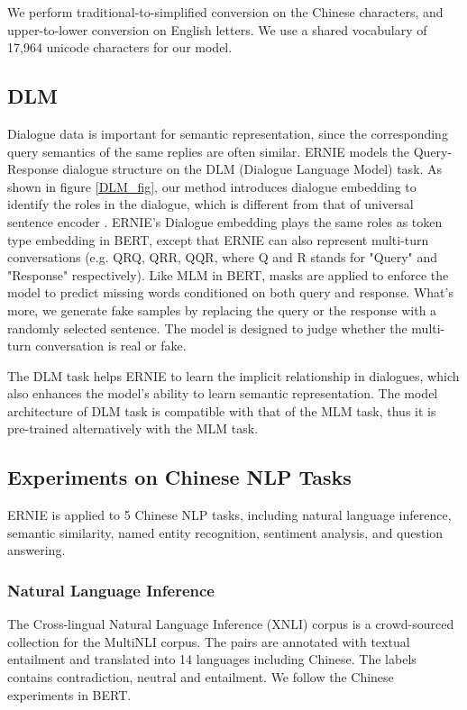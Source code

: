 \documentclass[11pt,a4paper]{article}
\begin{document}
 We perform traditional-to-simplified conversion on the Chinese characters, and upper-to-lower conversion on English letters. We use a shared vocabulary of 17,964 unicode characters for our model.


\subsection{DLM}
Dialogue data is important for semantic representation, since the corresponding query semantics of the same replies are often similar. ERNIE models the Query-Response dialogue structure on the DLM (Dialogue Language Model) task. As shown in figure \ref{DLM_fig}, our method introduces dialogue embedding to identify the roles in the dialogue, which is different from that of universal sentence encoder \cite{google_use}. ERNIE's Dialogue embedding plays the same roles as token type embedding in BERT, except that ERNIE can also represent multi-turn conversations (e.g. QRQ, QRR, QQR, where Q and R stands for "Query" and "Response" respectively). Like MLM in BERT, masks are applied to enforce the model to predict missing words conditioned on both query and response. What's more, we generate fake samples by replacing the query or the response with a randomly selected sentence. The model is designed to judge whether the multi-turn conversation is real or fake. 

The DLM task helps ERNIE to learn the implicit relationship in dialogues, which also enhances the model's ability to learn semantic representation. The model architecture of DLM task is compatible with that of the MLM task, thus it is pre-trained alternatively with the MLM task.

\subsection{Experiments on Chinese NLP Tasks}
ERNIE is applied to 5 Chinese NLP tasks, including natural language inference, semantic similarity, named entity recognition, sentiment analysis, and question answering.

\subsubsection{Natural Language Inference}
The Cross-lingual Natural Language Inference (XNLI) corpus \cite{liu2019multi} is a crowd-sourced collection for the MultiNLI corpus. The pairs are annotated with textual entailment and translated into 14 languages including Chinese. The labels contains contradiction, neutral and entailment. We follow the Chinese experiments in BERT\cite{devlin2018bert}.
\end{document}
